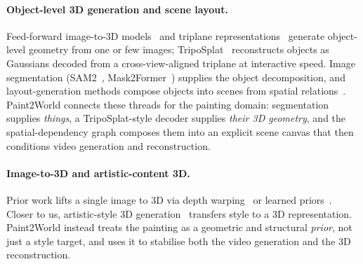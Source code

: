 \paragraph{Object-level 3D generation and scene layout.}
Feed-forward image-to-3D models~\cite{lrm} and triplane
representations~\cite{triplane2021} generate object-level geometry from one
or few images; TripoSplat~\cite{triposplat2025} reconstructs objects as
Gaussians decoded from a cross-view-aligned triplane at interactive speed.
Image segmentation (SAM2~\cite{sam2}, Mask2Former~\cite{mask2former})
supplies the object decomposition, and layout-generation methods compose
objects into scenes from spatial relations~\cite{scenecanvas2024}. Paint2World
connects these threads for the painting domain: segmentation supplies
\emph{things}, a TripoSplat-style decoder supplies \emph{their 3D geometry},
and the spatial-dependency graph composes them into an explicit scene canvas
that then conditions video generation and reconstruction.

\paragraph{Image-to-3D and artistic-content 3D.}
Prior work lifts a single image to 3D via depth
warping~\cite{sin3dgen,deep3dim} or learned priors~\cite{pixel3dmm}. Closer to
us, artistic-style 3D generation~\cite{artistic3d,luciddreamer} transfers
style to a 3D representation. Paint2World instead treats the painting as a
geometric and structural \emph{prior}, not just a style target, and uses it to
stabilise both the video generation and the 3D reconstruction.
